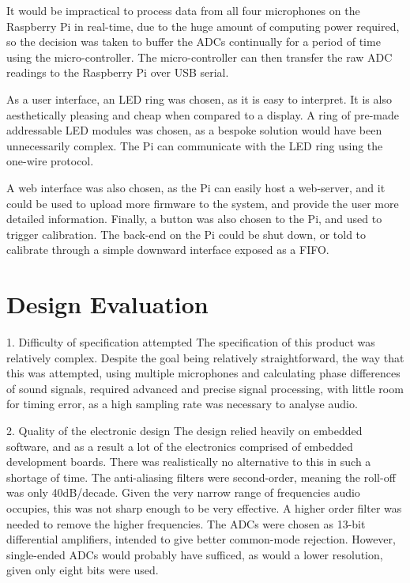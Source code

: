 \documentclass[a4paper]{article}
\begin{document}
It would be impractical to process data from all four microphones on the
Raspberry Pi in real-time, due to the huge amount of computing power required,
so the decision was taken to buffer the ADCs continually for a period of time
using the micro-controller. The micro-controller can then transfer the raw ADC
readings to the Raspberry Pi over USB serial.

As a user interface, an LED ring was chosen, as it is easy to interpret. It is
also aesthetically pleasing and cheap when compared to a display. A ring of
pre-made addressable LED modules was chosen, as a bespoke solution would have
been unnecessarily complex. The Pi can communicate with the LED ring using the
one-wire protocol.

A web interface was also chosen, as the Pi can easily host a web-server, and it
could be used to upload more firmware to the system, and provide the user more
detailed information.  Finally, a button was also chosen to the Pi, and used to
trigger calibration. The back-end on the Pi could be shut down, or told to
calibrate through a simple downward interface exposed as a FIFO.


\section{Design Evaluation}

1. Difficulty of specification attempted The specification of this product was
relatively complex. Despite the goal being relatively straightforward, the way
that this was attempted, using multiple microphones and calculating phase
differences of sound signals, required advanced and precise signal processing,
with little room for timing error, as a high sampling rate was necessary to
analyse audio.

2. Quality of the electronic design The design relied heavily on embedded
software, and as a result a lot of the electronics comprised of embedded
development boards. There was realistically no alternative to this in such a
shortage of time. The anti-aliasing filters were second-order, meaning the
roll-off was only 40dB/decade. Given the very narrow range of frequencies audio
occupies, this was not sharp enough to be very effective. A higher order filter
was needed to remove the higher frequencies.  The ADCs were chosen as 13-bit
differential amplifiers, intended to give better common-mode rejection. However,
single-ended ADCs would probably have sufficed, as would a lower resolution,
given only eight bits were used.
\end{document}
